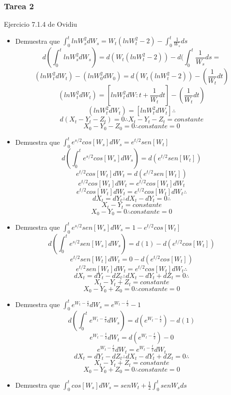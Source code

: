 \documentclass[11pt,fleqn]{book} %
\numberwithin{equation}{section} %
\numberwithin{figure}{section} %
\numberwithin{table}{section} %
\begin{document}
\subsubsection{Tarea 2}
Ejercicio 7.1.4 de Ovidiu\cite{ovidiu}
\begin{itemize}
    \item Demuestra que $\int_{0}^{t} lnW_{s}^{2} dW_{s} = W_{t}(lnW_{t}^{2} - 2) - \int_{0}^{t} \frac{1}{W_{s}} ds$
    $$ d(\int_{0}^{t} lnW_{s}^{2} dW_{s}) = d(W_{t}(lnW_{t}^{2} - 2)) - d(\int_{0}^{t} \frac{1}{W_{s}} ds= $$
    $$ (lnW_{t}^{2} dW_{t}) - (lnW_{0}^{2} dW_{0})= d(W_{t}(lnW_{t}^{2} - 2)) - (\frac{1}{W_{t}}dt)$$
    $$ (lnW_{t}^{2} dW_{t})= [lnW_{t}^{2} dW:{t} + \frac{1}{W_{t}} dt] - (\frac{1}{W_{t}}dt)$$
    $$ (lnW_{t}^{2} dW_{t})= [lnW_{t}^{2} dW_{t}] \therefore $$ 
    $$d(X_{t}-Y_{t}-Z_{t})=0 \therefore X_{t}-Y_{t}-Z_{t} = constante $$
    $$X_{0}-Y_{0}-Z_{0}=0 \therefore constante = 0 $$
    \item Demuestra que $\int_{0}^{t}e^{s/2} cos[W_{s}] dW_{s} = e^{t/2} sen[W_{t}]$
    $$d(\int_{0}^{t}e^{s/2} cos[W_{s}] dW_{s} )= d(e^{t/2} sen[W_{t}])$$
    $$ e^{t/2} cos[W_{t}] dW_{t} = d(e^{t/2} sen[W_{t}])$$
    $$ e^{t/2} cos[W_{t}] dW_{t} = e^{t/2}cos[W_{t}] dW_{t}$$
    $$ e^{t/2} cos[W_{t}] dW_{t} = e^{t/2}cos[W_{t}] dW_{t} \therefore$$
    $$ dX_{t} = dY_{t} \therefore dX_{t} - dY_{t} = 0 \therefore  $$
    $$ X_{t} - Y_{t} = constante $$
    $$ X_{0} - Y_{0} = 0 \therefore constante = 0 $$
    \item Demuestra que $\int_{0}^{t}e^{s/2} sen[W_{s}] dW_{s} = 1 - e^{t/2} cos[W_{t}]$
    $$d(\int_{0}^{t} e^{s/2} sen[W_{s}] dW_{s} )= d(1) - d(e^{t/2} cos[W_{t}])$$
    $$ e^{t/2} sen[W_{t}] dW_{t} = 0 - d(e^{t/2} cos[W_{t}])$$
    $$ e^{t/2} sen[W_{t}] dW_{t} = e^{t/2}cos[W_{t}] dW_{t} \therefore$$
    $$ dX_{t} = dY_{t} - dZ_{t} \therefore dX_{t} - dY_{t} + dZ_{t} = 0 \therefore  $$
    $$ X_{t} - Y_{t} + Z_{t} = constante $$
    $$ X_{0} - Y_{0} + Z_{0}= 0 \therefore constante = 0 $$
    \item Demuestra que $\int_{0}^{t} e^{W_{t}-\frac{s}{2}} dW_{s} = e^{W_{t}-\frac{t}{2}} - 1$
    $$d (\int_{0}^{t} e^{W_{t}-\frac{s}{2}} dW_{s}) = d(e^{W_{t}-\frac{t}{2}}) - d(1)$$
    $$e^{W_{t}-\frac{t}{2}} dW_{t} = d(e^{W_{t}-\frac{t}{2}}) - 0$$
    $$e^{W_{t}-\frac{t}{2}} dW_{t} = e^{W_{t}-\frac{t}{2}} dW_{t}$$
    $$ dX_{t} = dY_{t} - dZ_{t} \therefore dX_{t} - dY_{t} + dZ_{t} = 0 \therefore  $$
    $$ X_{t} - Y_{t} + Z_{t} = constante $$
    $$ X_{0} - Y_{0} + Z_{0}= 0 \therefore constante = 0 $$
    \item Demuestra que $\int_{0}^{t} cos[W_{s}] dW_{s} = senW_{t} + \frac{1}{2} \int_{0}^{t} senW_{s} ds$

\end{itemize}
\end{document}
